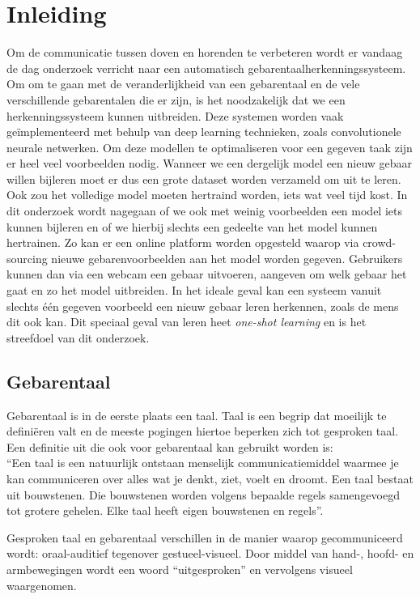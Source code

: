 \chapter{Inleiding}
Om de communicatie tussen doven en horenden te verbeteren wordt er vandaag de dag onderzoek verricht naar een automatisch gebarentaalherkenningssysteem. Om om te gaan met de veranderlijkheid van een gebarentaal en de vele verschillende gebarentalen die er zijn, is het noodzakelijk dat we een herkenningssysteem kunnen uitbreiden.
\npar Deze systemen worden vaak ge\"implementeerd met behulp van deep learning technieken, zoals convolutionele neurale netwerken. Om deze modellen te optimaliseren voor een gegeven taak zijn er heel veel voorbeelden nodig. Wanneer we een dergelijk model een nieuw gebaar willen bijleren moet er dus een grote dataset worden verzameld om uit te leren. Ook zou het volledige model moeten hertraind worden, iets wat veel tijd kost.
\npar In dit onderzoek wordt nagegaan of we ook met weinig voorbeelden een model iets kunnen bijleren en of we hierbij slechts een gedeelte van het model kunnen hertrainen. Zo kan er een online platform worden opgesteld waarop via crowd-sourcing nieuwe gebarenvoorbeelden aan het model worden gegeven. Gebruikers kunnen dan via een webcam een gebaar uitvoeren, aangeven om welk gebaar het gaat en zo het model uitbreiden.
\npar In het ideale geval kan een systeem vanuit slechts \'e\'en gegeven voorbeeld een nieuw gebaar leren herkennen, zoals de mens dit ook kan. Dit speciaal geval van leren heet \textit{one-shot learning} en is het streefdoel van dit onderzoek.
\section{Gebarentaal}

Gebarentaal is in de eerste plaats een taal. Taal is een begrip dat moeilijk te defini\"eren valt en de meeste pogingen hiertoe beperken zich tot gesproken taal. Een definitie uit \cite{buyens_gebarentaaltolken_2003} die ook voor gebarentaal kan gebruikt worden is: 
\\``Een taal is een natuurlijk ontstaan menselijk communicatiemiddel waarmee je kan communiceren over alles wat je denkt, ziet, voelt en droomt. Een taal bestaat uit bouwstenen. Die bouwstenen worden volgens bepaalde regels samengevoegd tot grotere gehelen. Elke taal heeft eigen bouwstenen en regels''.

\npar Gesproken taal en gebarentaal verschillen in de manier waarop gecommuniceerd wordt: oraal-auditief tegenover gestueel-visueel. Door middel van hand-, hoofd- en armbewegingen wordt een woord ``uitgesproken'' en vervolgens visueel waargenomen.

